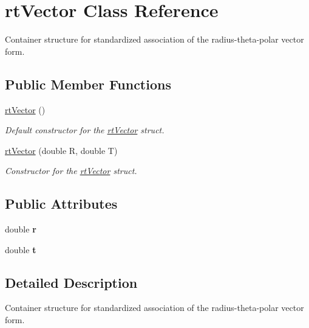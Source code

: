 \hypertarget{structrt_vector}{}\section{rt\+Vector Class Reference}
\label{structrt_vector}


Container structure for standardized association of the radius-\/theta-\/polar vector form.  


\subsection*{Public Member Functions}
\begin{DoxyCompactItemize}
\item 
\hyperlink{structrt_vector_a925c0326bc5d918e8bdb36a867b66228}{rt\+Vector} ()
\begin{DoxyCompactList}\small\item\em Default constructor for the \hyperlink{structrt_vector}{rt\+Vector} struct. \end{DoxyCompactList}\item 
\hyperlink{structrt_vector_a97268ebbcad1df534201f5225f7ccbb0}{rt\+Vector} (double R, double T)
\begin{DoxyCompactList}\small\item\em Constructor for the \hyperlink{structrt_vector}{rt\+Vector} struct. \end{DoxyCompactList}\end{DoxyCompactItemize}
\subsection*{Public Attributes}
\begin{DoxyCompactItemize}
\item 
\mbox{\label{structrt_vector_aae522780f6ddbf1a8d45dc69e89ab1b8}} 
double {\bfseries r}
\item 
\mbox{\label{structrt_vector_a8ab4ea9b5dfa69f99fcb5e62dd9b138d}} 
double {\bfseries t}
\end{DoxyCompactItemize}


\subsection{Detailed Description}
Container structure for standardized association of the radius-\/theta-\/polar vector form. 

